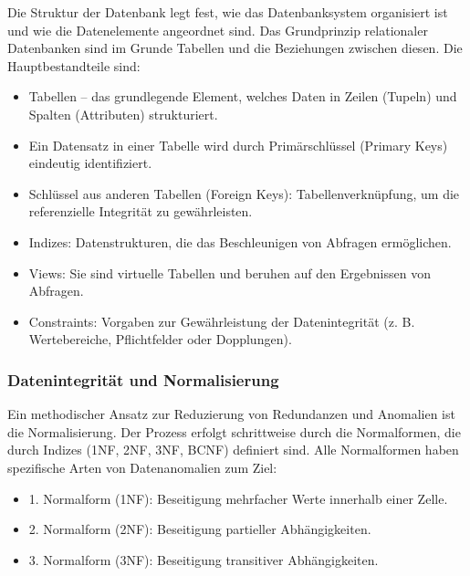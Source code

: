 Die Struktur der Datenbank legt fest, wie das Datenbanksystem organisiert ist und wie die Datenelemente angeordnet sind.
Das Grundprinzip relationaler Datenbanken sind im Grunde Tabellen und die Beziehungen zwischen diesen.
Die Hauptbestandteile sind: \cite*[35]{Gadatsch2019}

\begin{itemize}
\item Tabellen – das grundlegende Element, welches Daten in Zeilen (Tupeln) und Spalten (Attributen) strukturiert.
\item Ein Datensatz in einer Tabelle wird durch Primärschlüssel (Primary Keys) eindeutig identifiziert.
\item Schlüssel aus anderen Tabellen (Foreign Keys): Tabellenverknüpfung, um die referenzielle Integrität zu gewährleisten.
\item Indizes: Datenstrukturen, die das Beschleunigen von Abfragen ermöglichen.
\item Views: Sie sind virtuelle Tabellen und beruhen auf den Ergebnissen von Abfragen.
\item Constraints: Vorgaben zur Gewährleistung der Datenintegrität (z. B. Wertebereiche, Pflichtfelder oder Dopplungen).
\end{itemize}
\textit{%
}\subsubsection{Datenintegrität und Normalisierung}
\textit{%
}Ein methodischer Ansatz zur Reduzierung von Redundanzen und Anomalien ist die Normalisierung.
Der Prozess erfolgt schrittweise durch die Normalformen, die durch Indizes (1NF, 2NF, 3NF, BCNF) definiert sind.
Alle Normalformen haben spezifische Arten von Datenanomalien zum Ziel: \cite*[38-41]{Gadatsch2019}

\begin{itemize}

\item 1. Normalform (1NF): Beseitigung mehrfacher Werte innerhalb einer Zelle.
\item 2. Normalform (2NF): Beseitigung partieller Abhängigkeiten.
\item 3. Normalform (3NF): Beseitigung transitiver Abhängigkeiten.

\end{itemize}

